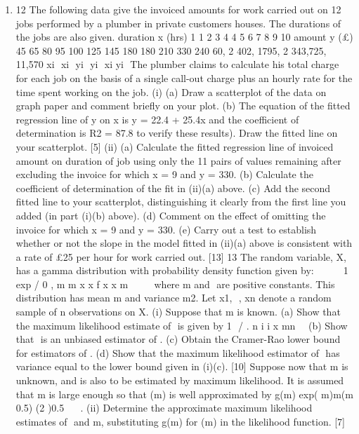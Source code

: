\documentclass[a4paper,12pt]{article}
\begin{document}
\begin{enumerate}
\item 12 The following data give the invoiced amounts for work carried out on 12 jobs
performed by a plumber in private customers houses. The durations of the jobs are
also given.
duration x (hrs) 1 1 2 3 4 4 5 6 7 8 9 10
amount y (£) 45 65 80 95 100 125 145 180 180 210 330 240
60, 2 402, 1795, 2 343,725, 11,570 xi  xi  yi  yi  xi yi 
The plumber claims to calculate his total charge for each job on the basis of a single
call-out charge plus an hourly rate for the time spent working on the job.
(i) (a) Draw a scatterplot of the data on graph paper and comment briefly on
your plot.
(b) The equation of the fitted regression line of y on x is y = 22.4 + 25.4x
and the coefficient of determination is R2 = 87.8%
to verify these results).
Draw the fitted line on your scatterplot. [5]
(ii) (a) Calculate the fitted regression line of invoiced amount on duration of
job using only the 11 pairs of values remaining after excluding the
invoice for which x = 9 and y = 330.
(b) Calculate the coefficient of determination of the fit in (ii)(a) above.
(c) Add the second fitted line to your scatterplot, distinguishing it clearly
from the first line you added (in part (i)(b) above).
(d) Comment on the effect of omitting the invoice for which x = 9 and
y = 330.
(e) Carry out a test to establish whether or not the slope in the model fitted
in (ii)(a) above is consistent with a rate of £25 per hour for work
carried out. [13]
13 The random variable, X, has a gamma distribution with probability density function
given by:
 
 
 
 
1 exp /
0 ,
m
m
x x
f x x
m
  
 
 
where m and  are positive constants. This distribution has mean m and variance
m2. Let x1,  , xn denote a random sample of n observations on X.
(i) Suppose that m is known.
(a) Show that the maximum likelihood estimate of  is given by
1
 / . n
i i x mn

 
(b) Show that 
is an unbiased estimator of .
(c) Obtain the Cramer-Rao lower bound for estimators of .
(d) Show that the maximum likelihood estimator of  has variance equal
to the lower bound given in (i)(c). [10]
Suppose now that m is unknown, and is also to be estimated by maximum likelihood.
It is assumed that m is large enough so that (m) is well approximated by
g(m) exp( m)m(m 0.5) (2 )0.5 
   .
(ii) Determine the approximate maximum likelihood estimates of  and m,
substituting g(m) for (m) in the likelihood function. [7]

\end{enumerate}
\end{document}
